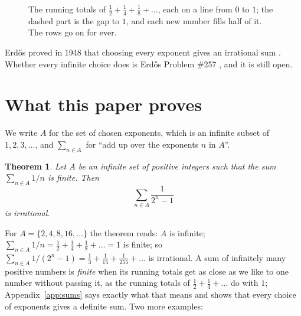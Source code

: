 \documentclass[10pt]{article}
\theoremstyle{plain}
\newtheorem{theorem}{Theorem}
\theoremstyle{definition}
\theoremstyle{remark}
\begin{document}
\begin{figure}[htb]
\centering
{}
\caption{The running totals of $\tfrac12+\tfrac14+\tfrac18+\dots$, each on a
line from $0$ to $1$; the dashed part is the gap to $1$, and each new number
fills half of it. The rows go on for ever.}
\label{fig:halving}
\end{figure}

Erd\H{o}s proved in 1948 that choosing every exponent gives an irrational sum
\cite{erdos1948}. Whether every infinite choice does is Erd\H{o}s Problem
\#257 \cite{erdosproblems257}, and it is still open.

\section{What this paper proves}\label{sec:problem}

We write $A$ for the set of chosen exponents, which is an infinite subset of
$1,2,3,\dots$, and $\sum_{n\in A}$ for ``add up
over the exponents $n$ in $A$''.

\begin{theorem}\label{thm:main}
Let $A$ be an infinite set of positive integers such that the sum
$\sum_{n\in A}1/n$ is finite. Then
\[
 \sum_{n\in A}\frac1{2^n-1}
\]
is irrational.
\end{theorem}

For $A=\{2,4,8,16,\dots\}$ the theorem reads: $A$ is infinite;
$\sum_{n\in A}1/n=\tfrac12+\tfrac14+\tfrac18+\dots=1$ is finite; so
$\sum_{n\in A}1/(2^n-1)=\tfrac13+\tfrac1{15}+\tfrac1{255}+\dots$ is
irrational. A sum of infinitely many positive numbers is \emph{finite} when
its running totals get as close as we like to one number without passing it,
as the running totals of $\tfrac12+\tfrac14+\dots$ do with $1$;
Appendix~\ref{app:sums} says exactly what that means and shows that every
choice of exponents gives a definite sum. Two more examples:
\end{document}
